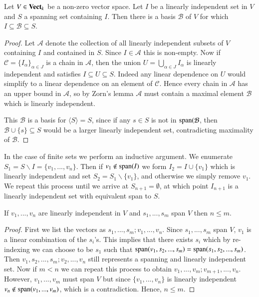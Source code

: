 \begin{theorem}
    Let $V \in \normalfont\textbf{Vect}_{k}$ be a non-zero vector space. Let $I$ be a linearly independent set in $V$ and $S$ a spanning set containing $I$. Then there is a basis $\mathcal{B}$ of $V$ for which $I \subseteq \mathcal{B} \subseteq S$.
\end{theorem}
\begin{proof}
    Let $\mathcal{A}$ denote the collection of all linearly independent subsets of $V$ containing $I$ and contained in $S$. Since $I \in \mathcal{A}$ this is non-empty. Now if $\mathcal{C} = \{I_{\alpha}\}_{\alpha \in J}$ is a chain in $\mathcal{A}$, then the union $U = \bigcup_{\alpha \in J}I_{\alpha}$ is linearly independent and satisfies $I \subseteq U \subseteq S$. Indeed any linear dependence on $U$ would simplify to a linear dependence on an element of $\mathcal{C}$. Hence every chain in $\mathcal{A}$ has an upper bound in $\mathcal{A}$, so by Zorn's lemma $\mathcal{A}$ must contain a maximal element $\mathcal{B}$ which is linearly independent.

    This $\mathcal{B}$ is a basis for $\langle S\rangle = S$, since if any $s \in S$ is not in $\operatorname{span}(\mathcal{B}$, then $\mathcal{B}\cup\{s\} \subseteq S$ would be a larger linearly independent set, contradicting maximality of $\mathcal{B}$.
\end{proof}

In the case of finite sets we perform an inductive argument. We enumerate $S_1 = S\backslash I = \{v_1,...,v_n\}$. Then if $v_1 \notin \operatorname{span}(I)$ we form $I_2 = I\cup\{v_1\}$ which is linearly independent and set $S_2 = S_1\backslash\{v_1\}$, and otherwise we simply remove $v_1$. We repeat this process until we arrive at $S_{n+1} = \emptyset$, at which point $I_{n+1}$ is a linearly independent set with equivalent span to $S$.

\begin{theorem}
    If $v_1,...,v_n$ are linearly independent in $V$ and $s_1,...,s_m$ span $V$ then $n \leq m$.
\end{theorem}
\begin{proof}
    First we list the vectors as $s_1,...,s_m;v_1,...,v_n$. Since $s_1,...,s_m$ span $V$, $v_1$ is a linear combination of the $s_i$'s. This implies that there exists $s_i$ which by re-indexing we can choose to be $s_1$ such that $\operatorname{span}(v_1,s_2,...,s_m) = \operatorname{span}(s_1,s_2,...,s_m)$. Then $v_1,s_2,...,s_m;v_2,...,v_n$ still represents a spanning and linearly independent set. Now if $m < n$ we can repeat this process to obtain $v_1,...,v_m;v_{m+1},...,v_n$. However, $v_1,...,v_m$ must span $V$ but since $\{v_1,...,v_n\}$ is linearly independent $v_n \notin \operatorname{span}(v_1,...,v_m)$, which is a contradiction. Hence, $n \leq m$.
\end{proof}

